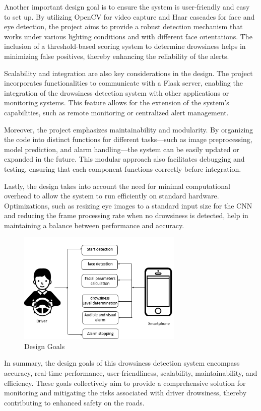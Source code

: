 \documentclass[12pt]{article}
\begin{document}
Another important design goal is to ensure the system is user-friendly and easy to set up. By utilizing OpenCV for video capture and Haar cascades for face and eye detection, the project aims to provide a robust detection mechanism that works under various lighting conditions and with different face orientations. The inclusion of a threshold-based scoring system to determine drowsiness helps in minimizing false positives, thereby enhancing the reliability of the alerts.

Scalability and integration are also key considerations in the design. The project incorporates functionalities to communicate with a Flask server, enabling the integration of the drowsiness detection system with other applications or monitoring systems. This feature allows for the extension of the system's capabilities, such as remote monitoring or centralized alert management.

Moreover, the project emphasizes maintainability and modularity. By organizing the code into distinct functions for different tasks—such as image preprocessing, model prediction, and alarm handling—the system can be easily updated or expanded in the future. This modular approach also facilitates debugging and testing, ensuring that each component functions correctly before integration.

Lastly, the design takes into account the need for minimal computational overhead to allow the system to run efficiently on standard hardware. Optimizations, such as resizing eye images to a standard input size for the CNN and reducing the frame processing rate when no drowsiness is detected, help in maintaining a balance between performance and accuracy.
\begin{figure}[h]
\centering
\includegraphics[width=0.7\textwidth]{DG}
\caption{Design Goals}
\end{figure}
\FloatBarrier

In summary, the design goals of this drowsiness detection system encompass accuracy, real-time performance, user-friendliness, scalability, maintainability, and efficiency. These goals collectively aim to provide a comprehensive solution for monitoring and mitigating the risks associated with driver drowsiness, thereby contributing to enhanced safety on the roads.
\end{document}
